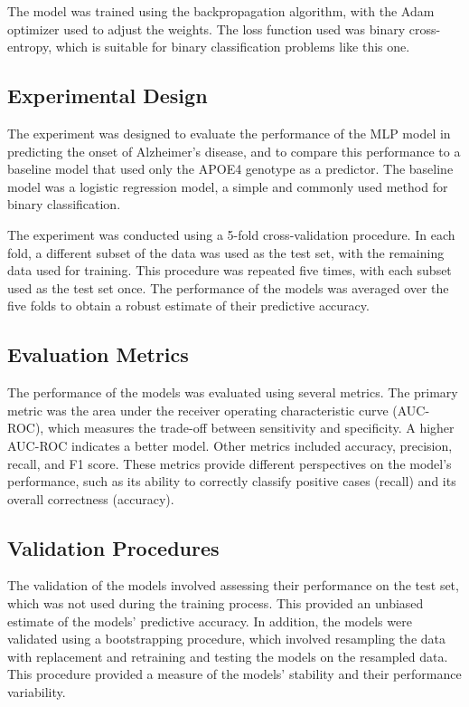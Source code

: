 \documentclass[conference]{IEEEtran}
\begin{document}
The model was trained using the backpropagation algorithm, with the Adam optimizer used to adjust the weights. The loss function used was binary cross-entropy, which is suitable for binary classification problems like this one.

\subsection{Experimental Design}

The experiment was designed to evaluate the performance of the MLP model in predicting the onset of Alzheimer's disease, and to compare this performance to a baseline model that used only the APOE4 genotype as a predictor. The baseline model was a logistic regression model, a simple and commonly used method for binary classification.

The experiment was conducted using a 5-fold cross-validation procedure. In each fold, a different subset of the data was used as the test set, with the remaining data used for training. This procedure was repeated five times, with each subset used as the test set once. The performance of the models was averaged over the five folds to obtain a robust estimate of their predictive accuracy.

\subsection{Evaluation Metrics}

The performance of the models was evaluated using several metrics. The primary metric was the area under the receiver operating characteristic curve (AUC-ROC), which measures the trade-off between sensitivity and specificity. A higher AUC-ROC indicates a better model. Other metrics included accuracy, precision, recall, and F1 score. These metrics provide different perspectives on the model's performance, such as its ability to correctly classify positive cases (recall) and its overall correctness (accuracy).

\subsection{Validation Procedures}

The validation of the models involved assessing their performance on the test set, which was not used during the training process. This provided an unbiased estimate of the models' predictive accuracy. In addition, the models were validated using a bootstrapping procedure, which involved resampling the data with replacement and retraining and testing the models on the resampled data. This procedure provided a measure of the models' stability and their performance variability.
\end{document}
